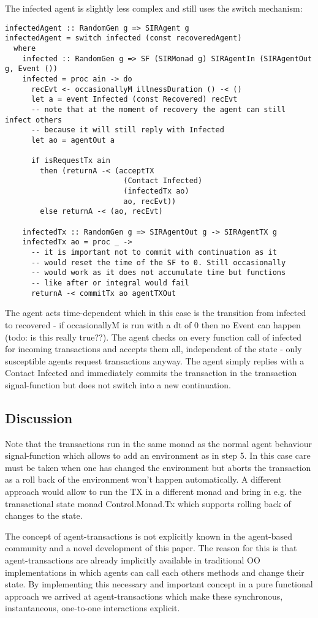 The infected agent is slightly less complex and still uses the switch mechanism:
\begin{verbatim}
infectedAgent :: RandomGen g => SIRAgent g
infectedAgent = switch infected (const recoveredAgent)
  where
    infected :: RandomGen g => SF (SIRMonad g) SIRAgentIn (SIRAgentOut g, Event ())
    infected = proc ain -> do
      recEvt <- occasionallyM illnessDuration () -< ()
      let a = event Infected (const Recovered) recEvt
      -- note that at the moment of recovery the agent can still infect others
      -- because it will still reply with Infected
      let ao = agentOut a

      if isRequestTx ain 
        then (returnA -< (acceptTX 
                           (Contact Infected)
                           (infectedTx ao)
                           ao, recEvt))
        else returnA -< (ao, recEvt)

    infectedTx :: RandomGen g => SIRAgentOut g -> SIRAgentTX g
    infectedTx ao = proc _ ->
      -- it is important not to commit with continuation as it
      -- would reset the time of the SF to 0. Still occasionally
      -- would work as it does not accumulate time but functions
      -- like after or integral would fail
      returnA -< commitTx ao agentTXOut
\end{verbatim}

The agent acts time-dependent which in this case is the transition from infected to recovered - if occasionallyM is run with a dt of 0 then no Event can happen (todo: is this really true??). The agent checks on every function call of infected for incoming transactions and accepts them all, independent of the state - only susceptible agents request transactions anyway. The agent simply replies with a Contact Infected and immediately commits the transaction in the transaction signal-function but does not switch into a new continuation.

\subsection{Discussion}
Note that the transactions run in the same monad as the normal agent behaviour signal-function which allows to add an environment as in step 5. In this case care must be taken when one has changed the environment but aborts the transaction as a roll back of the environment won't happen automatically. A different approach would allow to run the TX in a different monad and bring in e.g. the  transactional state monad Control.Monad.Tx which supports rolling back of changes to the state.

The concept of agent-transactions is not explicitly known in the agent-based community and a novel development of this paper. The reason for this is that agent-transactions are already implicitly available in traditional OO implementations in which agents can call each others methods and change their state. By implementing this necessary and important concept in a pure functional approach we arrived at agent-transactions which make these synchronous, instantaneous, one-to-one interactions explicit.